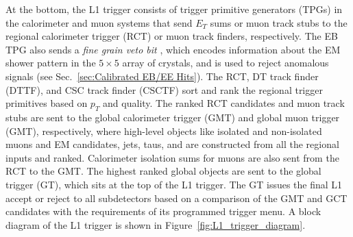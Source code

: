 \documentclass[dissertation.tex]{subfiles}
\begin{document}
At the bottom, the L1 trigger consists of trigger primitive generators (TPGs) in the calorimeter and muon systems that send $E_{T}$ sums or muon track stubs to the regional calorimeter trigger (RCT) or muon track finders, respectively.  The EB TPG also sends a \textit{fine grain veto bit} \cite{1546528}, which encodes information about the EM shower pattern in the $5\times5$ array of crystals, and is used to reject anomalous signals (see Sec.~\ref{sec:Calibrated EB/EE Hits}).  The RCT, DT track finder (DTTF), and CSC track finder (CSCTF) sort and rank the regional trigger primitives based on $p_{T}$ and quality.  The ranked RCT candidates and muon track stubs are sent to the global calorimeter trigger (GMT) and global muon trigger (GMT), respectively, where high-level objects like isolated and non-isolated muons and EM candidates, jets, taus, and \MET are constructed from all the regional inputs and ranked.  Calorimeter isolation sums for muons are also sent from the RCT to the GMT.  The highest ranked global objects are sent to the global trigger (GT), which sits at the top of the L1 trigger.  The GT issues the final L1 accept or reject to all subdetectors based on a comparison of the GMT and GCT candidates with the requirements of its programmed trigger menu.  A block diagram of the L1 trigger is shown in Figure~\ref{fig:L1_trigger_diagram}.
\end{document}
